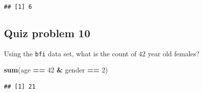 \documentclass[]{book}
\newenvironment{Shaded}{\begin{snugshade}}{\end{snugshade}}
\newcommand{\DecValTok}[1]{\textcolor[rgb]{0.00,0.00,0.81}{#1}}
\newcommand{\KeywordTok}[1]{\textcolor[rgb]{0.13,0.29,0.53}{\textbf{#1}}}
\newcommand{\NormalTok}[1]{#1}
\newcommand{\OperatorTok}[1]{\textcolor[rgb]{0.81,0.36,0.00}{\textbf{#1}}}
\newcommand{\StringTok}[1]{\textcolor[rgb]{0.31,0.60,0.02}{#1}}
\begin{document}
\begin{verbatim}
## [1] 6
\end{verbatim}

\hypertarget{quiz-problem-10}{%
\subsection{Quiz problem 10}\label{quiz-problem-10}}

Using the \texttt{bfi} data set, what is the count of 42 year old females?

\begin{Shaded}
\begin{Highlighting}[]
\KeywordTok{sum}\NormalTok{(age }\OperatorTok{==}\StringTok{ }\DecValTok{42} \OperatorTok{&}\StringTok{ }\NormalTok{gender }\OperatorTok{==}\StringTok{ }\DecValTok{2}\NormalTok{)}
\end{Highlighting}
\end{Shaded}

\begin{verbatim}
## [1] 21
\end{verbatim}


\end{document}

